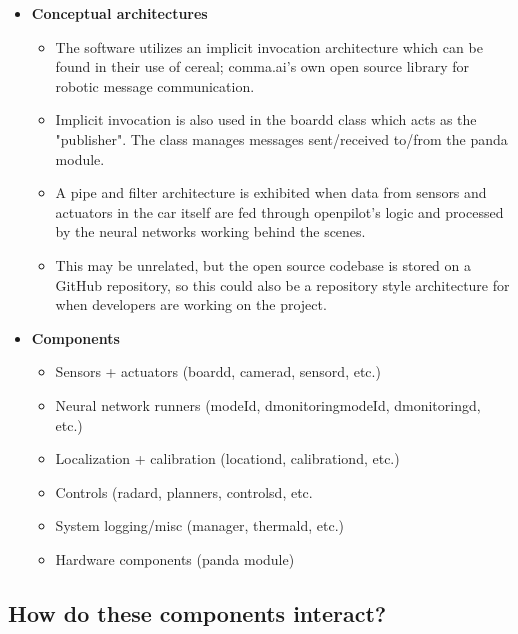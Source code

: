 \documentclass[12pt]{article}
\begin{document}
\begin{itemize}

    \item \textbf{Conceptual architectures}
    \begin{itemize}
        \item The software utilizes an implicit invocation architecture which can be found in their use of cereal; comma.ai's own open source library for robotic message communication. %
        \item Implicit invocation is also used in the boardd class which acts as the "publisher". The class manages messages sent/received to/from the panda module.
         \item A pipe and filter architecture is exhibited when data from sensors and actuators in the car itself are fed through openpilot's logic and processed by the neural networks working behind the scenes. %
        \item This may be unrelated, but the open source codebase is stored on a GitHub repository, so this could also be a repository style architecture for when developers are working on the project.
    \end{itemize}

    \item \textbf{Components}
    \begin{itemize}
        \item Sensors + actuators (boardd, camerad, sensord, etc.)
        \item Neural network runners (modeId, dmonitoringmodeId, dmonitoringd, etc.)
        \item Localization + calibration (locationd, calibrationd, etc.)
        \item Controls (radard, planners, controlsd, etc.
        \item System logging/misc (manager, thermald, etc.)
        \item Hardware components (panda module)
    \end{itemize}
\end{itemize}

\subsection{How do these components interact?}
\end{document}
